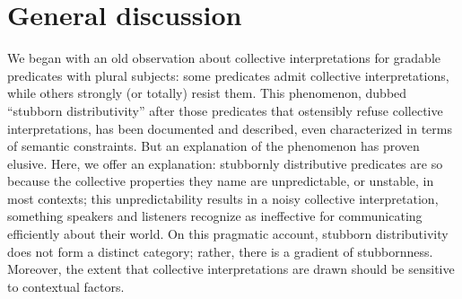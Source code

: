 \documentclass[preprint,12pt,authoryear,titlepage]{elsarticle}
\newcommand{\ndg}[1]{\textcolor{Green}{[ndg: #1]}}
\begin{document}
%
%


\section{General discussion}

We began with an old observation about collective interpretations for gradable predicates with plural subjects: some predicates admit collective interpretations, while others strongly (or totally) resist them. This phenomenon, dubbed ``stubborn distributivity'' after those predicates that ostensibly refuse collective interpretations, has been documented and described, even characterized in terms of semantic constraints. But an explanation of the phenomenon has proven elusive. Here, we offer an explanation: stubbornly distributive predicates are so because the collective properties they name are unpredictable, or unstable, in most contexts; this unpredictability results in a noisy collective interpretation, something speakers and listeners recognize as ineffective for communicating efficiently about their world.
On this pragmatic account, stubborn distributivity does not form a distinct category; rather, there is a gradient of stubbornness. Moreover, the extent that collective interpretations are drawn should be sensitive to contextual factors.
\end{document}
